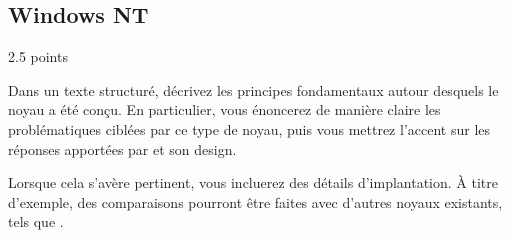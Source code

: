 %
%
\subsection{Windows NT}
{\hfill{} \scriptsize{2.5 points}}

Dans un texte structur\'e, d\'ecrivez les principes fondamentaux autour
desquels le noyau  a \'et\'e con\c{c}u. En particulier, vous
\'enoncerez de mani\`ere claire les probl\'ematiques cibl\'ees par ce type de
noyau, puis vous mettrez l'accent sur les r\'eponses apport\'ees par 
et son design.

Lorsque cela s'av\`ere pertinent, vous incluerez des d\'etails d'implantation.
\`A titre d'exemple, des comparaisons pourront \^etre faites avec d'autres
noyaux existants, tels que .

